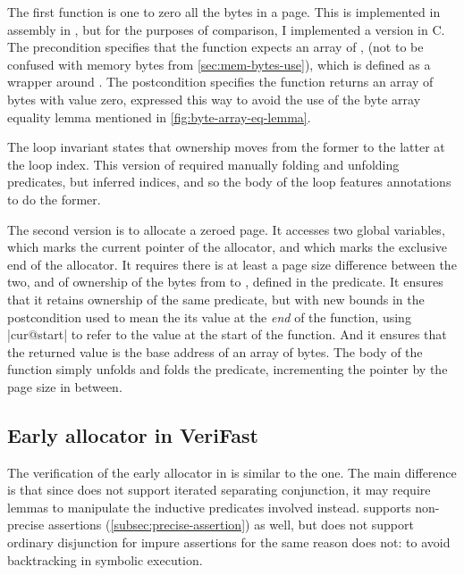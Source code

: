 The first function is one to zero all the bytes in a page. This is implemented
in assembly in , but for the purposes of comparison, I implemented a
version in C. The precondition specifies that the function expects an array of
, (not to be confused with memory bytes from
\cref{sec:mem-bytes-use}), which is defined as a wrapper around
. The postcondition specifies the function returns an
array of bytes with value zero, expressed this way to avoid the use of the byte
array equality lemma mentioned in \cref{fig:byte-array-eq-lemma}.

The loop invariant states that ownership moves from the former to the latter at
the loop index. This version of  required manually folding and unfolding
predicates, but inferred indices, and so the body of the loop features
annotations to do the former.


The second version is to allocate a zeroed page. It accesses two global
variables,  which marks the current pointer of the allocator, and
 which marks the exclusive end of the allocator. It requires there
is at least a page size difference between the two, and of ownership of the
bytes from  to , defined in the 
predicate. It ensures that it retains ownership of the same predicate, but with
new bounds \textemdash{}  in the postcondition used to mean the
its value at the \emph{end} of the function, using \cninline|{cur}@start| to
refer to the value at the start of the function. And it ensures that the
returned value is the base address of an array of bytes. The body of the
function simply unfolds and folds the  predicate,
incrementing the pointer by the page size in between.


\subsection{Early allocator in VeriFast}

The verification of the early allocator in  is similar to the
 one. The main difference is that since  does not support
iterated separating conjunction, it may require lemmas to manipulate the
inductive predicates involved instead.  supports non-precise
assertions (\cref{subsec:precise-assertion}) as well, but does not support
ordinary disjunction for impure assertions for the same reason  does
not: to avoid backtracking in symbolic
execution.

